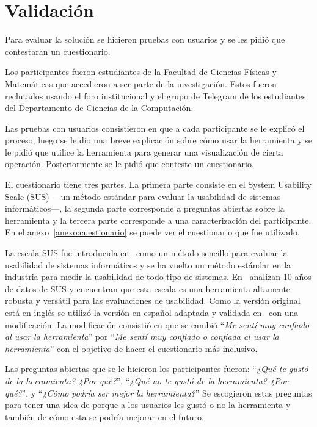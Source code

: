 \chapter{Validación}

Para evaluar la solución se hicieron pruebas con usuarios y se les pidió que contestaran un cuestionario. 

Los participantes fueron estudiantes de la Facultad de Ciencias Físicas y Matemáticas que accedieron a ser parte de la investigación. Estos fueron reclutados usando el foro institucional y el grupo de Telegram de los estudiantes del Departamento de Ciencias de la Computación.

Las pruebas con usuarios consistieron en que a cada participante se le explicó el proceso, luego se le dio una breve explicación sobre cómo usar la herramienta y se le pidió que utilice la herramienta para generar una visualización de cierta operación. Posteriormente se le pidió que conteste un cuestionario.

El cuestionario tiene tres partes. La primera parte consiste en el System Usability Scale (SUS) ---un método estándar para evaluar la usabilidad de sistemas informáticos---, la segunda parte corresponde a preguntas abiertas sobre la herramienta y la tercera parte corresponde a una caracterización del participante. En el anexo~\ref{anexo:cuestionario} se puede ver el cuestionario que fue utilizado.

La escala SUS fue introducida en~\cite{brooke1996quick} como un método sencillo para evaluar la usabilidad de sistemas informáticos y se ha vuelto un método estándar en la industria para medir la usabilidad de todo tipo de sistemas. En~\cite{evaluation-of-sus} analizan 10 años de datos de SUS y encuentran que esta escala es una herramienta altamente robusta y versátil para las evaluaciones de usabilidad. Como la versión original está en inglés se utilizó la versión en español adaptada y validada en~\cite{spanish-sus} con una modificación. La modificación consistió en que se cambió ``\textit{Me sentí muy confiado al usar la herramienta}'' por ``\textit{Me sentí muy confiado o confiada al usar la herramienta}'' con el objetivo de hacer el cuestionario más inclusivo.

Las preguntas abiertas que se le hicieron los participantes fueron: ``\textit{¿Qué te gustó de la herramienta? ¿Por qué?}'', ``\textit{¿Qué no te gustó de la herramienta? ¿Por qué?}'', y ``\textit{¿Cómo podría ser mejor la herramienta?}'' Se escogieron estas preguntas para tener una idea de porque a los usuarios les gustó o no la herramienta y también de cómo esta se podría mejorar en el futuro.


